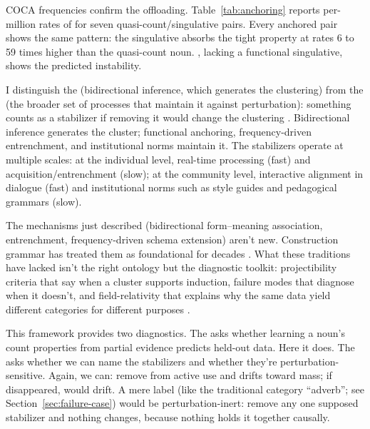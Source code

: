\documentclass[12pt,a4paper]{article}
\begin{document}
COCA frequencies confirm the offloading. Table~\ref{tab:anchoring} reports per-million rates of  for seven quasi-count/singulative pairs. Every anchored pair shows the same pattern: the singulative absorbs the tight property at rates 6 to 59 times higher than the quasi-count noun. , lacking a functional singulative, shows the predicted instability.



I distinguish the  (bidirectional inference, which generates the clustering) from the  (the broader set of processes that maintain it against perturbation): something counts as a stabilizer if removing it would change the clustering \citep{reynolds2025stack}. Bidirectional inference generates the cluster; functional anchoring, frequency-driven entrenchment, and institutional norms maintain it. The stabilizers operate at multiple scales: at the individual level, real-time processing (fast) and acquisition/entrenchment (slow); at the community level, interactive alignment in dialogue (fast) and institutional norms such as style guides and pedagogical grammars (slow).

The mechanisms just described (bidirectional form--meaning association, entrenchment, frequency-driven schema extension) aren't new. Construction grammar has treated them as foundational for decades \citep{goldberg1995constructions,langacker1987foundations,bybee2010}. What these traditions have lacked isn't the right ontology but the diagnostic toolkit: projectibility criteria that say when a cluster supports induction, failure modes that diagnose when it doesn't, and field-relativity that explains why the same data yield different categories for different purposes \citep{reynolds2025stack}.

This framework provides two diagnostics. The  asks whether learning a noun's count properties from partial evidence predicts held-out data. Here it does. The  asks whether we can name the stabilizers and whether they're perturbation-sensitive. Again, we can: remove  from active use and  drifts toward mass; if  disappeared,  would drift. A mere label (like the traditional category \enquote{adverb}; see Section~\ref{sec:failure-case}) would be perturbation-inert: remove any one supposed stabilizer and nothing changes, because nothing holds it together causally.
\end{document}

